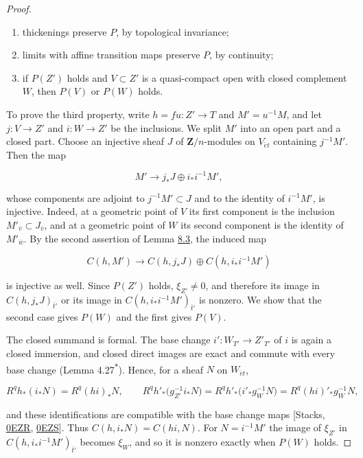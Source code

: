 \documentclass[11pt]{article}
\newcommand{\bpout}[1]{#1\textsuperscript{\hyperlink{bp-outside}{\ensuremath{\ast}}}}
\begin{document}
\begin{proof}[{Proof}]
\begin{enumerate}
\item thickenings preserve \(P\), by topological invariance;
\item limits with affine transition maps preserve \(P\), by continuity;
\item if \(P(Z')\) holds and \(V\subset Z'\) is a quasi-compact open with closed complement \(W\), then \(P(V)\) or \(P(W)\) holds.
\end{enumerate}

To prove the third property, write \(h=fu:Z'\to T\) and \(M'=u^{-1}M\), and let \(j:V\to Z'\) and \(i:W\to Z'\) be the inclusions. We split \(M'\) into an open part and a closed part. Choose an injective sheaf \(J\) of \(\mathbf Z/n\)-modules on \(V_{\acute{e}t}\) containing \(j^{-1}M'\). Then the map

\[
M'\longrightarrow j_*J\oplus i_*i^{-1}M',
\]

whose components are adjoint to \(j^{-1}M'\subset J\) and to the identity of \(i^{-1}M'\), is injective. Indeed, at a geometric point of \(V\) its first component is the inclusion \(M'_{\bar v}\subset J_{\bar v}\), and at a geometric point of \(W\) its second component is the identity of \(M'_{\bar w}\). By the second assertion of Lemma \hyperref[bp17]{8.3}, the induced map

\[
C(h,M')\longrightarrow C(h,j_*J)\oplus C(h,i_*i^{-1}M')
\]

is injective as well. Since \(P(Z')\) holds, \(\xi_{Z'}\neq0\), and therefore its image in \(C(h,j_*J)_{\bar t'}\) or its image in \(C(h,i_*i^{-1}M')_{\bar t'}\) is nonzero. We show that the second case gives \(P(W)\) and the first gives \(P(V)\).

The closed summand is formal. The base change \(i':W_{T'}\to Z'_{T'}\) of \(i\) is again a closed immersion, and closed direct images are exact and commute with every base change (Lemma \bpout{4.27}). Hence, for a sheaf \(N\) on \(W_{\acute{e}t}\),

\[
R^qh_*(i_*N)=R^q(hi)_*N,
\qquad
R^qh'_*\bigl(g_{Z'}^{-1}i_*N\bigr)=R^qh'_*\bigl(i'_*g_W^{-1}N\bigr)
=R^q(hi)'_*g_W^{-1}N,
\]

and these identifications are compatible with the base change maps [Stacks, \href{https://stacks.math.columbia.edu/tag/0EZR}{0EZR}, \href{https://stacks.math.columbia.edu/tag/0EZS}{0EZS}]. Thus \(C(h,i_*N)=C(hi,N)\). For \(N=i^{-1}M'\) the image of \(\xi_{Z'}\) in \(C(h,i_*i^{-1}M')_{\bar t'}\) becomes \(\xi_W\), and so it is nonzero exactly when \(P(W)\) holds.


\end{proof}
\end{document}
